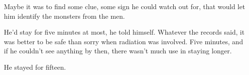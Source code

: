 Maybe it was to find some clue, some sign he could watch out for, that would let him identify the monsters from the men.



He'd stay for five minutes at most, he told himself.  Whatever the records said, it was better to be safe than sorry when radiation was involved.  Five minutes, and if he couldn't see anything by then, there wasn't much use in staying longer.



He stayed for fifteen.





